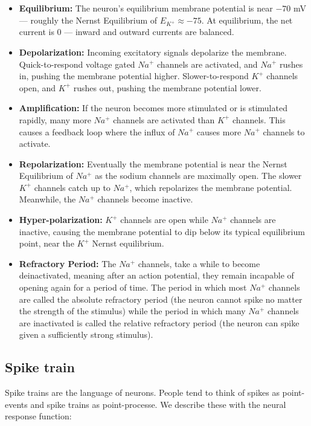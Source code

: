 \documentclass[paper=a4, fontsize=11pt]{scrartcl} %
\numberwithin{equation}{section} %
\numberwithin{figure}{section} %
\numberwithin{table}{section} %
\begin{document}
\begin{itemize}
    \item \textbf{Equilibrium:} The neuron’s equilibrium membrane potential is near \(-70\) mV — roughly the Nernst Equilibrium of \( E_{K^+} \approx -75 \). At equilibrium, the net current is \(0\) — inward and outward currents are balanced.
    \item \textbf{Depolarization:} Incoming excitatory signals depolarize the membrane. Quick-to-respond voltage gated \( Na^+ \) channels are activated, and \( Na^+ \) rushes in, pushing the membrane potential higher. Slower-to-respond \( K^+ \) channels open, and \( K^+ \) rushes out, pushing the membrane potential lower.
    \item \textbf{Amplification:} If the neuron becomes more stimulated or is stimulated rapidly, many more \( Na^+ \) channels are activated than \( K^+ \) channels. This causes a feedback loop where the influx of \( Na^+ \) causes more \( Na^+ \) channels to activate.
    \item \textbf{Repolarization:} Eventually the membrane potential is near the Nernst Equilibrium of \( Na^+ \) as the sodium channels are maximally open. The slower \( K^+ \) channels catch up to \( Na^+ \), which repolarizes the membrane potential. Meanwhile, the \( Na^+ \) channels become inactive.
    \item \textbf{Hyper-polarization:} \( K^+ \) channels are open while \( Na^+ \) channels are inactive, causing the membrane potential to dip below its typical equilibrium point, near the \( K^+ \) Nernst equilibrium.
    \item \textbf{Refractory Period:} The \( Na^+ \) channels, take a while to become deinactivated, meaning after an action potential, they remain incapable of opening again for a period of time. The period in which most \( Na^+ \) channels are called the absolute refractory period (the neuron cannot spike no matter the strength of the stimulus) while the period in which many \( Na^+ \) channels are inactivated is called the relative refractory period (the neuron can spike given a sufficiently strong stimulus).
\end{itemize}



\subsection{Spike train}

Spike trains are the language of neurons. People tend to think of spikes as point-events and spike trains as point-processe. We describe these with the neural response function:
\end{document}
